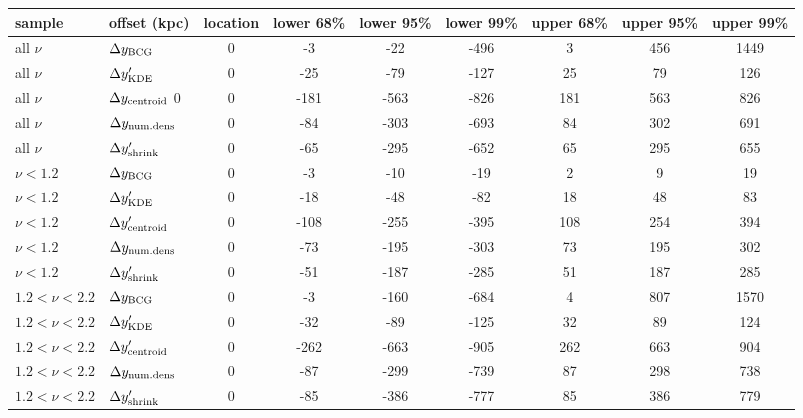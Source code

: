 \begin{tabular}{llccccccc}
\toprule
sample & offset (kpc) &  location &  lower 68\% &  lower 95\% &  lower 99\% &  upper 68\% &  upper 95\% &  upper 99\% \\
\midrule
all $\nu$ & $\Delta y_{\rm BCG}$               &         0 &          -3 &         -22 &        -496 &           3 &         456 &        1449 \\
all $\nu$ & $\Delta y_{\rm KDE}'$              &         0 &         -25 &         -79 &        -127 &          25 &          79 &         126 \\
all $\nu$ & $\Delta y_{\rm centroid}$         0&        0 &         -181 &-563 &        -826 &          181&         563&         826\\
all $\nu$ & $\Delta y_{\rm num. dens}$         &        0 &         -84 &        -303 &        -693 &          84 &         302 &         691 \\
all $\nu$ & $\Delta y_{\rm shrink}'$           &        0 &         -65 &        -295 &        -652 &          65 &         295 &         655 \\
\midrule
$\nu < 1.2$ & $\Delta y_{\rm BCG}$             &        0 &          -3 &         -10 &         -19 &           2 &           9 &          19 \\
$\nu < 1.2$ & $\Delta y_{\rm KDE}'$            &         0 &         -18 &         -48 &         -82 &          18 &          48 &          83 \\
$\nu < 1.2$ & $\Delta y_{\rm centroid}'$        &        0 &        -108 &        -255 &        -395 &         108 &         254 &         394 \\
$\nu < 1.2$ & $\Delta y_{\rm num. dens}$       &        0 &         -73 &        -195 &        -303 &          73 &         195 &         302 \\
$\nu < 1.2$ & $\Delta y_{\rm shrink}'$         &         0 &         -51 &        -187 &        -285 &          51 &         187 &         285 \\
\midrule
$1.2 < \nu < 2.2$ & $\Delta y_{\rm BCG}$       &         0 &          -3 &        -160 &        -684 &           4 &         807 &        1570 \\
$1.2 < \nu < 2.2$ & $\Delta y_{\rm KDE}'$      &        0 &         -32 &         -89 &        -125 &          32 &          89 &         124 \\
$1.2 < \nu < 2.2$ & $\Delta y_{\rm centroid}'$  &         0 &        -262 &        -663 &        -905 &         262 &         663 &         904 \\
$1.2 < \nu < 2.2$ & $\Delta y_{\rm num. dens}$ &         0 &         -87 &        -299 &        -739 &          87 &         298 &         738 \\
$1.2 < \nu < 2.2$ & $\Delta y_{\rm shrink}'$   &        0 &         -85 &        -386 &        -777 &          85 &         386 &         779 \\
\bottomrule
\end{tabular}
